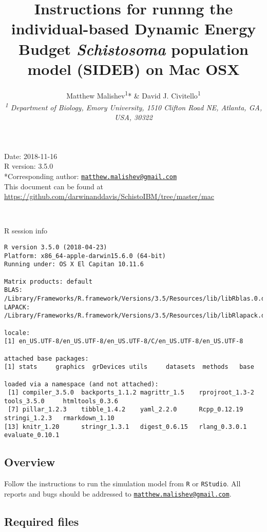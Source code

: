 \documentclass[10,portrait]{article}
\title{Instructions for runnng the individual-based Dynamic Energy Budget
\emph{Schistosoma} population model (SIDEB) on Mac OSX}
\author{Matthew Malishev\textsuperscript{1}* \& David J.
Civitello\textsuperscript{1}\\[2\baselineskip]\emph{\textsuperscript{1}
Department of Biology, Emory University, 1510 Clifton Road NE, Atlanta,
GA, USA, 30322}}
\date{}
\begin{document}
\maketitle

{
\hypersetup{linkcolor=black}
\setcounter{tocdepth}{4}
\tableofcontents
}
\newpage   

Date: 2018-11-16\\
R version: 3.5.0\\
*Corresponding author:
\href{mailto:matthew.malishev@gmail.com}{\nolinkurl{matthew.malishev@gmail.com}}\\
This document can be found at
\url{https://github.com/darwinanddavis/SchistoIBM/tree/master/mac}

~

R session info

\begin{verbatim}
R version 3.5.0 (2018-04-23)
Platform: x86_64-apple-darwin15.6.0 (64-bit)
Running under: OS X El Capitan 10.11.6

Matrix products: default
BLAS: /Library/Frameworks/R.framework/Versions/3.5/Resources/lib/libRblas.0.dylib
LAPACK: /Library/Frameworks/R.framework/Versions/3.5/Resources/lib/libRlapack.dylib

locale:
[1] en_US.UTF-8/en_US.UTF-8/en_US.UTF-8/C/en_US.UTF-8/en_US.UTF-8

attached base packages:
[1] stats     graphics  grDevices utils     datasets  methods   base     

loaded via a namespace (and not attached):
 [1] compiler_3.5.0  backports_1.1.2 magrittr_1.5    rprojroot_1.3-2 tools_3.5.0     htmltools_0.3.6
 [7] pillar_1.2.3    tibble_1.4.2    yaml_2.2.0      Rcpp_0.12.19    stringi_1.2.3   rmarkdown_1.10 
[13] knitr_1.20      stringr_1.3.1   digest_0.6.15   rlang_0.3.0.1   evaluate_0.10.1
\end{verbatim}

\newpage  

\subsection{Overview}\label{overview}

Follow the instructions to run the simulation model from \texttt{R} or
\texttt{RStudio}. All reports and bugs should be addressed to
\href{mailto:matthew.malishev@gmail.com}{\nolinkurl{matthew.malishev@gmail.com}}.

\subsection{Required files}\label{required-files}
\end{document}
